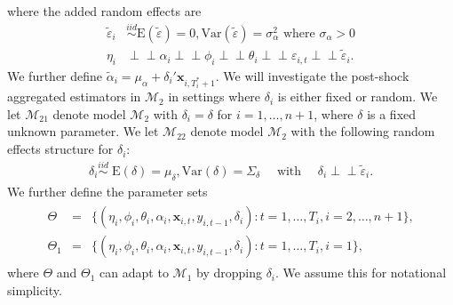 \documentclass[11pt]{article}
\def\mbf#1{\mathbf{#1}} %
\newcommand{\simiid}{\stackrel{iid}{\sim}} %
\def\where{\text{ where }} %
\newcommand{\indep}{\perp \!\!\! \perp } %
\def\mrm#1{\mathrm{#1}} %
\def\t#1{\tilde{#1}} %
\def\mc#1{\mathcal{#1}} %
\def\E#1{\mathrm{E}(#1)} %
\def\var#1{\mathrm{Var}(#1)} %
\theoremstyle{definition}
\begin{document}
 where the added random effects are
\begin{align*}
\t{\varepsilon}_{i} &\simiid  \E{\t{\varepsilon}}=0, \var{\t{\varepsilon}}=\sigma^2_{\alpha} \where \sigma_{\alpha}>0\\
\eta_i &\indep  \alpha_i \indep \phi_i \indep \theta_i \indep \varepsilon_{i,t} \indep \t{\varepsilon}_{i}.
\end{align*}
We further define 
$\tilde{\alpha}_i=\mu_{\alpha}+\delta_i'\mbf{x}_{i, T_i^*+1}$. 
We will investigate the post-shock aggregated estimators in $\mc{M}_2$ 
in settings where $\delta_i$ is either fixed or random. 
We let $\mc{M}_{21}$ denote model $\mc{M}_{2}$ with $\delta_i = \delta$ for $i= 1, \ldots, n+1$, 
where $\delta$ is a  fixed unknown parameter.
We let $\mc{M}_{22}$ denote model $\mc{M}_{2}$ with the following random effects 
structure for $\delta_i$:
\begin{align*}
\delta_i \overset{iid}{\sim}\;  \mrm{E}(\delta) = \mu_\delta, \var{\delta} = \Sigma_\delta
   \quad \text{ with } \quad  \delta_i  \indep \t{\varepsilon}_{i}.
\end{align*}
We further define the parameter sets
\begin{align}
  \begin{array}{lll}
     \Theta &= &\{(\eta_i, \phi_i, \theta_i, \alpha_i, \mbf{x}_{i,t}, y_{i,t-1}, \delta_i)\colon t= 1, \ldots, T_i, i = 2, \ldots, n +1\},\\
    \Theta_1 &= &\{(\eta_i, \phi_i, \theta_i, \alpha_i, \mbf{x}_{i,t}, y_{i,t-1}, \delta_i)\colon t= 1, \ldots, T_i, i = 1\},\label{parameter}
  \end{array}
\end{align}
where $\Theta$ and $\Theta_1$ can adapt to $\mc{M}_1$ by dropping $\delta_i$. We assume this for notational simplicity.
\end{document}
